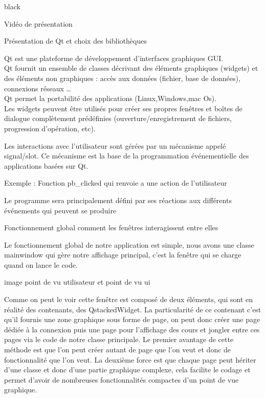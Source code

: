 \begin{items}{black}{\Bullet}
\item Vidéo de présentation


\item Présentation de Qt et choix des bibliothèques

Qt est une plateforme de développement d’interfaces graphiques GUI.\\

Qt fournit un ensemble de classes décrivant des éléments graphiques (widgets) et des éléments non graphiques : accès aux données (fichier, base de données), connexions réseaux …\\

Qt permet la portabilité des applications (Linux,Windows,mac Os).\\
Les widgets peuvent être utilisés pour créer ses propres fenêtres et boîtes de dialogue complètement prédéfinies (ouverture/enregistrement de fichiers, progression d’opération, etc). \\


Les interactions avec l’utilisateur sont gérées par un mécanisme appelé signal/slot. Ce mécanisme est la base de la programmation événementielle des applications basées sur Qt.

Exemple : Fonction pb\_clicked qui renvoie a une action de l’utilisateur

Le programme sera principalement défini par ses réactions aux différents événements qui peuvent se produire



\item Fonctionnement global comment les fenêtres interagissent entre elles

Le fonctionnement global de notre application est simple, nous avons une classe mainwindow qui gère notre affichage principal, c’est la fenêtre qui se charge quand on lance le code.

image point de vu utilisateur et point de vu ui

Comme on peut le voir cette fenêtre est composé de deux éléments, qui sont en réalité des contenants, des QstackedWidget. La particularité de ce contenant c’est qu’il fournis une zone graphique sous forme de page, on peut donc créer une page dédiée à la connexion puis une page pour l’affichage des cours et jongler entre ces pages via le code de notre classe principale.
Le premier avantage de cette méthode est que l’on peut créer autant de page que l'on veut et donc de fonctionnalité que l’on veut. La deuxième force est que chaque page peut hériter d’une classe et donc d’une partie graphique complexe, cela facilite le codage et permet d’avoir de nombreuses fonctionnalités compactes d’un point de vue graphique.




\end{items}
